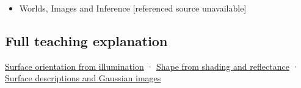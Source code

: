 \begin{itemize}
\tightlist
\item
  {Worlds, Images and Inference {[}referenced source unavailable{]}}
\end{itemize}

\subsection{Full teaching explanation}\label{appendix-89b2d5b7c9e1-full-teaching-explanation}

\hyperref[04-visual-computing-ii-ch032-surface-orientation-from-illumination]{Surface orientation from illumination} · \hyperref[04-visual-computing-ii-ch032-shape-from-shading-and-reflectance]{Shape from shading and reflectance} · \hyperref[04-visual-computing-ii-ch032-surface-descriptions-and-gaussian-images]{Surface descriptions and Gaussian images}
